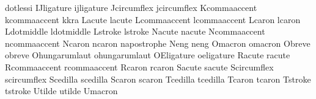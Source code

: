  dotlessi      {}
 IJligature    {}
 ijligature    {}
 Jcircumflex   {}
 jcircumflex   {}
 Kcommaaccent  {}
 kcommaaccent  {}
 kkra          {}
 Lacute        {}
 lacute        {}
 Lcommaaccent  {}
 lcommaaccent  {}
 Lcaron        {}
 lcaron        {}
 Ldotmiddle    {}
 ldotmiddle    {}
 Lstroke       {}
 lstroke       {}
 Nacute        {}
 nacute        {}
 Ncommaaccent  {}
 ncommaaccent  {}
 Ncaron        {}
 ncaron        {}
 napostrophe   {}
 Neng          {}
 neng          {}
 Omacron       {}
 omacron       {}
 Obreve        {}
 obreve        {}
 Ohungarumlaut {}
 ohungarumlaut {}
 OEligature    {}
 oeligature    {}
 Racute        {}
 racute        {}
 Rcommaaccent  {}
 rcommaaccent  {}
 Rcaron        {}
 rcaron        {}
 Sacute        {}
 sacute        {}
 Scircumflex   {}
 scircumflex   {}
 Scedilla      {}
 scedilla      {}
 Scaron        {}
 scaron        {}
 Tcedilla      {}
 tcedilla      {}
 Tcaron        {}
 tcaron        {}
 Tstroke       {}
 tstroke       {}
 Utilde        {}
 utilde        {}
 Umacron       {}

